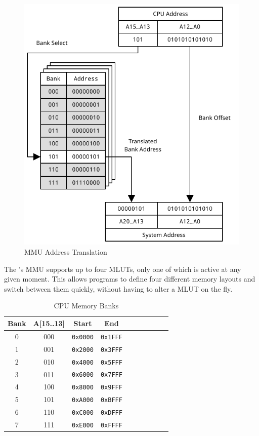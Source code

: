 \begin{figure}[ht]
    \begin{center}
        \includegraphics[scale=0.65]{images/mmu_address_xlate.pdf}
    \end{center}
    \caption{MMU Address Translation}
    \label{fig:mmu_address_xlate}
\end{figure}

The \jr's MMU supports up to four MLUTs, only one of which is active at any given moment. This allows programs to define four different memory layouts and switch between them quickly, without having to alter a MLUT on the fly.

\begin{table}[ht]
	\begin{center}
		\begin{tabular}{| c | c || c | c | c | c | c | c | c | c |} \hline
			Bank & A[15..13] & Start & End \\ \hline\hline
			0 & 000 & \verb+0x0000+ & \verb+0x1FFF+ \\ \hline
			1 & 001 & \verb+0x2000+ & \verb+0x3FFF+ \\ \hline
			2 & 010 & \verb+0x4000+ & \verb+0x5FFF+ \\ \hline
			3 & 011 & \verb+0x6000+ & \verb+0x7FFF+ \\ \hline
			4 & 100 & \verb+0x8000+ & \verb+0x9FFF+ \\ \hline
			5 & 101 & \verb+0xA000+ & \verb+0xBFFF+ \\ \hline
			6 & 110 & \verb+0xC000+ & \verb+0xDFFF+ \\ \hline
			7 & 111 & \verb+0xE000+ & \verb+0xFFFF+ \\ \hline
		\end{tabular}
	\end{center}
	\caption{CPU Memory Banks}
	\label{tab:mem_banks}
\end{table}

